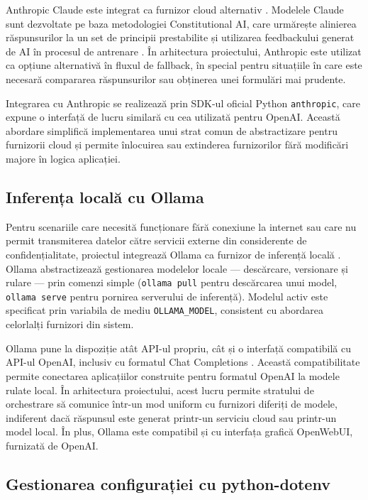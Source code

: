 \documentclass[12pt, a4paper, oneside, romanian]{teza-upb}
\begin{document}
  
Anthropic Claude este integrat ca furnizor cloud alternativ \cite{anthropic_claude}. Modelele Claude sunt dezvoltate pe baza metodologiei Constitutional AI, care urmărește alinierea răspunsurilor la un set de principii prestabilite și utilizarea feedbackului generat de AI în procesul de antrenare \cite{bai2022constitutional}. În arhitectura proiectului, Anthropic este utilizat ca opțiune alternativă în fluxul de fallback, în special pentru situațiile în care este necesară compararea răspunsurilor sau obținerea unei formulări mai prudente.

Integrarea cu Anthropic se realizează prin SDK-ul oficial Python \texttt{anthropic}, care expune o interfață de lucru similară cu cea utilizată pentru OpenAI. Această abordare simplifică implementarea unui strat comun de abstractizare pentru furnizorii cloud și permite înlocuirea sau extinderea furnizorilor fără modificări majore în logica aplicației.

\subsection{Inferența locală cu Ollama}

Pentru scenariile care necesită funcționare fără conexiune la internet sau care 
nu permit transmiterea datelor către servicii externe din considerente de 
confidențialitate, proiectul integrează Ollama ca furnizor de inferență locală 
\cite{ollama_doc}. Ollama abstractizează gestionarea modelelor locale — 
descărcare, versionare și rulare — prin comenzi simple (\texttt{ollama pull} 
pentru descărcarea unui model, \texttt{ollama serve} pentru pornirea serverului 
de inferență). Modelul activ este specificat prin variabila de mediu 
\texttt{OLLAMA\_MODEL}, consistent cu abordarea celorlalți furnizori din sistem.


Ollama pune la dispoziție atât API-ul propriu, cât și o interfață compatibilă cu API-ul OpenAI, inclusiv cu formatul Chat Completions \cite{ollama_openai_compatibility}. Această compatibilitate permite conectarea aplicațiilor construite pentru formatul OpenAI la modele rulate local. În arhitectura proiectului, acest lucru permite stratului de orchestrare să comunice într-un mod uniform cu furnizori diferiți de modele, indiferent dacă răspunsul este generat printr-un serviciu cloud sau printr-un model local. În plus, Ollama este compatibil și cu interfața grafică OpenWebUI, furnizată de OpenAI.

\subsection{Gestionarea configurației cu python-dotenv}
\end{document}
